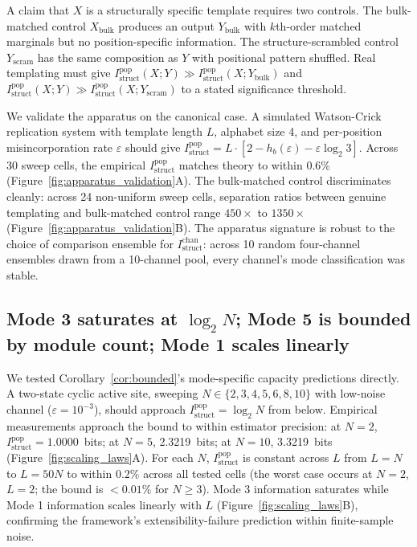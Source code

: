 \documentclass[aps,prx,reprint,amsmath,amssymb,floatfix,superscriptaddress,nofootinbib]{revtex4-2}
\theoremstyle{plain-thm}
\theoremstyle{definition-thm}
\newcommand{\Istructpop}{I_{\mathrm{struct}}^{\mathrm{pop}}}
\newcommand{\Istructchan}{I_{\mathrm{struct}}^{\mathrm{chan}}}
\newcommand{\Hbin}{h_b}
\begin{document}
A claim that $X$ is a structurally specific template requires two controls. The bulk-matched control $X_{\mathrm{bulk}}$ produces an output $Y_{\mathrm{bulk}}$ with $k$th-order matched marginals but no position-specific information. The structure-scrambled control $Y_{\mathrm{scram}}$ has the same composition as $Y$ with positional pattern shuffled. Real templating must give $\Istructpop(X; Y) \gg \Istructpop(X; Y_{\mathrm{bulk}})$ and $\Istructpop(X; Y) \gg \Istructpop(X; Y_{\mathrm{scram}})$ to a stated significance threshold.

We validate the apparatus on the canonical case. A simulated Watson-Crick replication system with template length $L$, alphabet size 4, and per-position misincorporation rate $\varepsilon$ should give $\Istructpop = L \cdot \left[2 - \Hbin(\varepsilon) - \varepsilon \log_2 3\right]$. Across 30 sweep cells, the empirical $\Istructpop$ matches theory to within 0.6\% (Figure~\ref{fig:apparatus_validation}A). The bulk-matched control discriminates cleanly: across 24 non-uniform sweep cells, separation ratios between genuine templating and bulk-matched control range $450 \times$ to $1350 \times$ (Figure~\ref{fig:apparatus_validation}B). The apparatus signature is robust to the choice of comparison ensemble for $\Istructchan$: across 10 random four-channel ensembles drawn from a 10-channel pool, every channel's mode classification was stable.

\subsection{Mode 3 saturates at $\log_2 N$; Mode 5 is bounded by module count; Mode 1 scales linearly}

We tested Corollary~\ref{cor:bounded}'s mode-specific capacity predictions directly. A two-state cyclic active site, sweeping $N \in \{2, 3, 4, 5, 6, 8, 10\}$ with low-noise channel ($\varepsilon = 10^{-3}$), should approach $\Istructpop = \log_2 N$ from below. Empirical measurements approach the bound to within estimator precision: at $N = 2$, $\Istructpop = 1.0000$~bits; at $N = 5$, 2.3219~bits; at $N = 10$, 3.3219~bits (Figure~\ref{fig:scaling_laws}A). For each $N$, $\Istructpop$ is constant across $L$ from $L = N$ to $L = 50N$ to within $0.2\%$ across all tested cells (the worst case occurs at $N = 2$, $L = 2$; the bound is $< 0.01\%$ for $N \ge 3$). Mode 3 information saturates while Mode 1 information scales linearly with $L$ (Figure~\ref{fig:scaling_laws}B), confirming the framework's extensibility-failure prediction within finite-sample noise.
\end{document}
